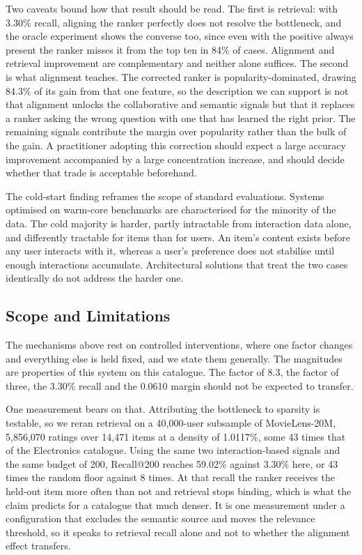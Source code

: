\documentclass[10pt,twocolumn]{article}
\begin{document}
Two caveats bound how that result should be read. The first is retrieval: with
3.30\% recall, aligning the ranker perfectly does not resolve the bottleneck,
and the oracle experiment shows the converse too, since even with the positive
always present the ranker misses it from the top ten in 84\% of cases.
Alignment and retrieval improvement are complementary and neither alone
suffices. The second is what alignment teaches. The corrected ranker is
popularity-dominated, drawing 84.3\% of its gain from that one feature, so the
description we can support is not that alignment unlocks the collaborative and
semantic signals but that it replaces a ranker asking the wrong question with
one that has learned the right prior. The remaining signals contribute the
margin over popularity rather than the bulk of the gain. A practitioner
adopting this correction should expect a large accuracy improvement
accompanied by a large concentration increase, and should decide whether that
trade is acceptable beforehand.

The cold-start finding reframes the scope of standard evaluations. Systems
optimised on warm-core benchmarks are characterised for the minority of the
data. The cold majority is harder, partly intractable from interaction data
alone, and differently tractable for items than for users. An item's content
exists before any user interacts with it, whereas a user's preference does not
stabilise until enough interactions accumulate. Architectural solutions that
treat the two cases identically do not address the harder one.

\subsection{Scope and Limitations}
\label{sec:limits}

The mechanisms above rest on controlled interventions, where one factor
changes and everything else is held fixed, and we state them generally. The
magnitudes are properties of this system on this catalogue. The factor of 8.3,
the factor of three, the 3.30\% recall and the 0.0610 margin should not be
expected to transfer.

One measurement bears on that. Attributing the bottleneck to sparsity is
testable, so we reran retrieval on a 40{,}000-user subsample of
MovieLens-20M, 5{,}856{,}070 ratings over 14{,}471 items at a density of
1.0117\%, some 43 times that of the Electronics catalogue. Using the same two
interaction-based signals and the same budget of 200, Recall@200 reaches
59.02\% against 3.30\% here, or 43 times the random floor against 8 times. At
that recall the ranker receives the held-out item more often than not and
retrieval stops binding, which is what the claim predicts for a catalogue that
much denser. It is one measurement under a configuration that excludes the
semantic source and moves the relevance threshold, so it speaks to retrieval
recall alone and not to whether the alignment effect transfers.
\end{document}
